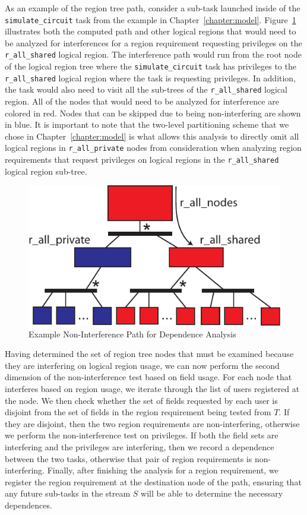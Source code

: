 As an example of the region tree path, consider a 
sub-task launched inside of the {\tt simulate\_circuit}
task from the example in Chapter~\ref{chapter:model}.
Figure~\ref{fig:interferencepath} illustrates both the
computed path and other logical regions that would need
to be analyzed for interferences for a region requirement
requesting privileges on the {\tt r\_all\_shared} logical
region. The interference path would run from the root node
of the logical region tree where the {\tt simulate\_circuit}
task has privileges to the {\tt r\_all\_shared} logical region
where the task is requesting privileges. In addition, the task
would also need to visit all the sub-trees of the 
{\tt r\_all\_shared} logical region. All of the nodes that
would need to be analyzed for interference are colored in
red. Nodes that can be skipped due to being non-interfering
are shown in blue. It is important to note that the two-level
partitioning scheme that we chose in Chapter~\ref{chapter:model}
is what allows this analysis to directly omit all logical
regions in {\tt r\_all\_private} nodes from consideration
when analyzing region requirements that request privileges
on logical regions in the {\tt r\_all\_shared} logical region
sub-tree.

\begin{figure}[h]
\centering
\includegraphics[scale=0.7]{figs/NonInterferencePath.pdf}
\caption{Example Non-Interference Path for Dependence Analysis
\label{fig:interferencepath}}
\end{figure}

Having determined the set of region tree nodes that
must be examined because they are interfering on 
logical region usage, we can now perform the second
dimension of the non-interference test based on
field usage. For each node that interferes based on
region usage, we iterate through the
list of users registered at the node.
We then check whether the set of fields requested
by each user is disjoint from the 
set of fields in the region requirement being
tested from $T$. If they are disjoint, then the
two region requirements are non-interfering, otherwise
we perform the non-interference test on privileges.
If both the field sets are interfering and the 
privileges are interfering, then we record a 
dependence between the two tasks, otherwise that
pair of region requirements is non-interfering.
Finally, after finishing the analysis for a
region requirement, we register the region 
requirement at the destination node of the
path, ensuring that any future sub-tasks in 
the stream $S$ will be able to determine
the necessary dependences.

